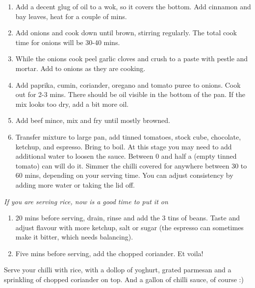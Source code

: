 \documentclass[
]{book}
\providecommand{\tightlist}{%
  \setlength{\itemsep}{0pt}\setlength{\parskip}{0pt}}
\begin{document}
\begin{enumerate}
\def\labelenumi{\arabic{enumi}.}
\tightlist
\item
  Add a decent glug of oil to a wok, so it covers the bottom. Add cinnamon and bay leaves, heat for a couple of mins.
\item
  Add onions and cook down until brown, stirring regularly. The total cook time for onions will be 30-40 mins.
\item
  While the onions cook peel garlic cloves and crush to a paste with pestle and mortar. Add to onions as they are cooking.
\item
  Add paprika, cumin, coriander, oregano and tomato puree to onions. Cook out for 2-3 mins. There should be oil visible in the bottom of the pan. If the mix looks too dry, add a bit more oil.
\item
  Add beef mince, mix and fry until mostly browned.
\item
  Transfer mixture to large pan, add tinned tomatoes, stock cube, chocolate, ketchup, and espresso. Bring to boil. At this stage you may need to add additional water to loosen the sauce. Between 0 and half a (empty tinned tomato) can will do it. Simmer the chilli covered for anywhere between 30 to 60 mins, depending on your serving time. You can adjust consistency by adding more water or taking the lid off.
\end{enumerate}

\emph{If you are serving rice, now is a good time to put it on}

\begin{enumerate}
\def\labelenumi{\arabic{enumi}.}
\setcounter{enumi}{6}
\tightlist
\item
  20 mins before serving, drain, rinse and add the 3 tins of beans. Taste and adjust flavour with more ketchup, salt or sugar (the espresso can sometimes make it bitter, which needs balancing).
\item
  Five mins before serving, add the chopped coriander. Et voila!
\end{enumerate}

Serve your chilli with rice, with a dollop of yoghurt, grated parmesan and a sprinkling of chopped coriander on top. And a gallon of chilli sauce, of course :)

  
\end{document}
